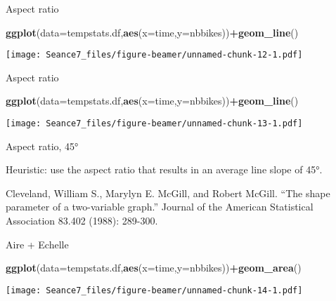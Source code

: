 \documentclass[ignorenonframetext,]{beamer}
\newenvironment{Shaded}{\begin{snugshade}}{\end{snugshade}}
\newcommand{\DataTypeTok}[1]{\textcolor[rgb]{0.13,0.29,0.53}{#1}}
\newcommand{\KeywordTok}[1]{\textcolor[rgb]{0.13,0.29,0.53}{\textbf{#1}}}
\newcommand{\NormalTok}[1]{#1}
\newcommand{\OperatorTok}[1]{\textcolor[rgb]{0.81,0.36,0.00}{\textbf{#1}}}
\begin{document}
\begin{frame}[fragile]{Aspect ratio}
\protect\hypertarget{aspect-ratio-1}{}

\begin{Shaded}
\begin{Highlighting}[]
\KeywordTok{ggplot}\NormalTok{(}\DataTypeTok{data=}\NormalTok{tempstats.df,}\KeywordTok{aes}\NormalTok{(}\DataTypeTok{x=}\NormalTok{time,}\DataTypeTok{y=}\NormalTok{nbbikes))}\OperatorTok{+}\KeywordTok{geom_line}\NormalTok{()}
\end{Highlighting}
\end{Shaded}

\texttt{[image: Seance7\_files/figure-beamer/unnamed-chunk-12-1.pdf]}

\end{frame}

\begin{frame}[fragile]{Aspect ratio}
\protect\hypertarget{aspect-ratio-2}{}

\begin{Shaded}
\begin{Highlighting}[]
\KeywordTok{ggplot}\NormalTok{(}\DataTypeTok{data=}\NormalTok{tempstats.df,}\KeywordTok{aes}\NormalTok{(}\DataTypeTok{x=}\NormalTok{time,}\DataTypeTok{y=}\NormalTok{nbbikes))}\OperatorTok{+}\KeywordTok{geom_line}\NormalTok{()}
\end{Highlighting}
\end{Shaded}

\texttt{[image: Seance7\_files/figure-beamer/unnamed-chunk-13-1.pdf]}

\end{frame}

\begin{frame}{Aspect ratio, 45°}
\protect\hypertarget{aspect-ratio-45}{}

Heuristic: use the aspect ratio that results in an average line slope of
45°.

Cleveland, William S., Marylyn E. McGill, and Robert McGill. ``The shape
parameter of a two-variable graph.'' Journal of the American Statistical
Association 83.402 (1988): 289-300.

\end{frame}

\begin{frame}[fragile]{Aire + Echelle}
\protect\hypertarget{aire-echelle}{}

\begin{Shaded}
\begin{Highlighting}[]
\KeywordTok{ggplot}\NormalTok{(}\DataTypeTok{data=}\NormalTok{tempstats.df,}\KeywordTok{aes}\NormalTok{(}\DataTypeTok{x=}\NormalTok{time,}\DataTypeTok{y=}\NormalTok{nbbikes))}\OperatorTok{+}\KeywordTok{geom_area}\NormalTok{()}
\end{Highlighting}
\end{Shaded}

\texttt{[image: Seance7\_files/figure-beamer/unnamed-chunk-14-1.pdf]}

\end{frame}
\end{document}
